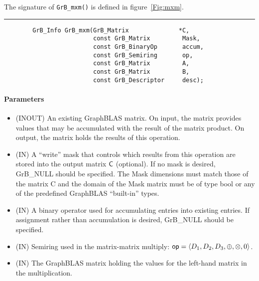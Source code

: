 The signature of {\tt GrB\_mxm()} is defined in figure~\ref{Fig:mxm}.
\begin{figure*}[h]
\hrule
\caption{The GrB\_mxm() function signature and basic argument definitions.}
\label{Fig:mxm}

\begin{verbatim}
        GrB_Info GrB_mxm(GrB_Matrix              *C,
                         const GrB_Matrix         Mask,
                         const GrB_BinaryOp       accum,
                         const GrB_Semiring       op,
                         const GrB_Matrix         A, 
                         const GrB_Matrix         B,
                         const GrB_Descriptor     desc);
\end{verbatim}

\paragraph{Parameters}

\begin{itemize}[leftmargin=1.1in]
    \item[{\sf C}]    ({\sf INOUT}) An existing GraphBLAS matrix. On
    input, the matrix provides values that may be accumulated with the
    result of the matrix product.   On output, the matrix holds the
    results of this operation.

    \item[{\sf Mask}] ({\sf IN}) A ``write'' mask that controls which
    results from this operation are stored into the output matrix
    ${\sf C}$ (optional).  If no mask is desired,  {\sf GrB\_NULL}
    should be specified. The Mask dimensions must match those of the
    matrix {\sf C} and the domain of the {\sf Mask} matrix must be
    of type {\sf bool} or any of the predefined GraphBLAS ``built-in'' types.

    \item[{\sf accum}] ({\sf IN}) A binary operator used for accumulating entries
    into existing  entries. If assignment rather than accumulation is
    desired, {\sf GrB\_NULL} should be specified.

    \item[{\sf op}] ({\sf IN}) Semiring used in the matrix-matrix
    multiply: ${\sf op}=\langle D_1,D_2,D_3,\oplus,\otimes,0 \rangle$.

    \item[{\sf A}] ({\sf IN}) The GraphBLAS matrix holding the values
    for the left-hand matrix in the multiplication.


\end{itemize}
\end{figure*}
